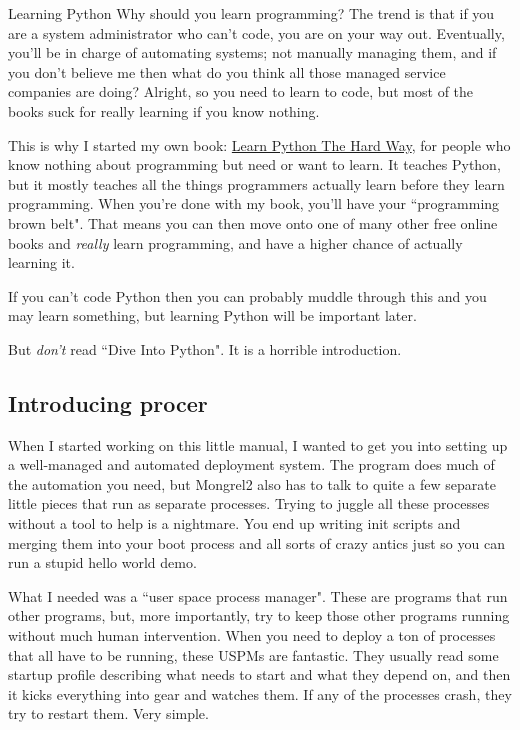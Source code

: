 \begin{aside}{Learning Python}
Why should you learn programming?  The trend is that if you are a system administrator
who can't code, you are on your way out.  Eventually, you'll be in charge of automating
systems; not manually managing them, and if you don't believe me then what do you think all
those managed service companies are doing?  Alright, so you need to learn to code, but
most of the books suck for really learning if you know nothing.

This is why I started my own book: \href{http://learnpythonthehardway.org}{Learn
Python The Hard Way}, for people who know nothing about programming but need or
want to learn.  It teaches Python, but it mostly teaches all the things
programmers actually learn before they learn programming.  When you're done
with my book, you'll have your ``programming brown belt".  That means you can
then move onto one of many other free online books and \emph{really} learn
programming, and have a higher chance of actually learning it.

If you can't code Python then you can probably muddle through this and you may
learn something, but learning Python will be important later.

But \emph{don't} read ``Dive Into Python". It is a horrible introduction.
\end{aside}

\subsection{Introducing procer}

When I started working on this little manual, I wanted to get you into setting up
a well-managed and automated deployment system.  The  program does
much of the automation you need, but Mongrel2 also has to talk to quite a few
separate little pieces that run as separate processes.  Trying to juggle all these
processes without a tool to help is a nightmare.  You end up writing init scripts
and merging them into your boot process and all sorts of crazy antics just so you
can run a stupid hello world demo.

What I needed was a ``user space process manager".  These are programs that run other
programs, but, more importantly, try to keep those other programs running without much
human intervention.  When you need to deploy a ton of processes that all have to
be running, these USPMs are fantastic.  They usually read some startup profile describing
what needs to start and what they depend on, and then it kicks everything into gear
and watches them.  If any of the processes crash, they try to restart them.  Very simple.

